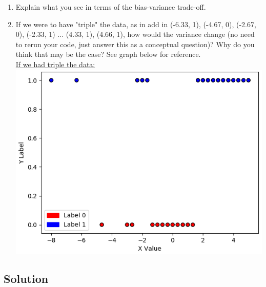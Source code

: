 \documentclass[submit]{harvardml}
\begin{document}
\begin{problem}
\begin{enumerate}
\item Explain what you see in terms of the bias-variance trade-off.

\item If we were to have "triple" the data, as in add in (-6.33, 1), (-4.67, 0), (-2.67, 0), (-2.33, 1) ... (4.33, 1), (4.66, 1), how would the variance change (no need to rerun your code, just answer this 
  as a conceptual question)? Why do you think that may be the case? See graph below for reference. \\
  
\underline{If we had triple the data:} \\

\includegraphics[scale=0.45]{tripleddata.png}
  
\end{enumerate}

\end{problem}

\newpage

\subsection*{Solution}
\end{document}
